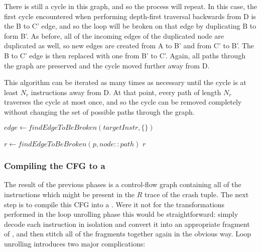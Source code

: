 \documentclass[12pt,a4paper]{book}
\begin{document}
There is still a cycle in this graph, and so the process will repeat.
In this case, the first cycle encountered when performing depth-first traversal backwards from D is the B to C' edge, and so the loop will be broken on that edge by duplicating B to form B'.
As before, all of the incoming edges of the duplicated node are duplicated as well, so new edges are created from A to B' and from C' to B'.
The B to C' edge is then replaced with one from B' to C'.
Again, all paths through the graph are preserved and the cycle moved further away from D.

This algorithm can be iterated as many times as necessary until the cycle is at least $N_r$ instructions away from D.
At that point, every path of length $N_r$ traverses the cycle at most once, and so the cycle can be removed completely without changing the set of possible paths through the graph.

\begin{algorithmic}
     \STATE $edge \gets findEdgeToBeBroken(targetInstr, \{\})$
     \ELSE
        \ENDFOR
     \ENDIF
  \ENDWHILE
\end{algorithmic}

\begin{algorithmic}
     \ENDIF
     \STATE $r \gets findEdgeToBeBroken(p, node::path)$
         \RETURN $r$
     \ENDIF
  \ENDFOR
\end{algorithmic}



\subsubsection{Compiling the CFG to a \StateMachine}

The result of the previous phases is a control-flow graph containing all of the instructions which might be present in the $R$ trace of the crash tuple.
The next step is to compile this CFG into a \StateMachine.
Were it not for the transformations performed in the loop unrolling phase this would be straightforward: simply decode each instruction in isolation and convert it into an appropriate fragment of \StateMachine, and then stitch all of the fragments together again in the obvious way.
Loop unrolling introduces two major complications:
\end{document}

